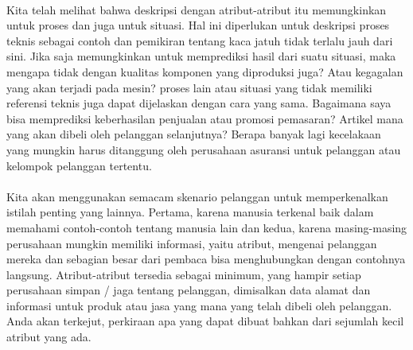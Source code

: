\paragraph{} Kita telah melihat bahwa deskripsi dengan atribut-atribut itu memungkinkan untuk proses dan juga untuk situasi. Hal ini diperlukan untuk deskripsi proses teknis sebagai contoh dan pemikiran tentang kaca jatuh tidak terlalu jauh dari sini. Jika saja memungkinkan untuk memprediksi hasil dari suatu situasi, maka mengapa tidak dengan kualitas komponen yang diproduksi juga? Atau kegagalan yang akan terjadi pada mesin? proses lain atau situasi yang tidak memiliki referensi teknis juga dapat dijelaskan dengan cara yang sama. Bagaimana saya bisa memprediksi keberhasilan penjualan atau promosi pemasaran? Artikel mana yang akan dibeli oleh pelanggan selanjutnya? Berapa banyak lagi kecelakaan yang mungkin harus ditanggung oleh perusahaan asuransi untuk pelanggan atau kelompok pelanggan tertentu.

\paragraph{} Kita akan menggunakan semacam skenario pelanggan untuk memperkenalkan istilah penting yang lainnya. Pertama, karena manusia terkenal baik dalam memahami contoh-contoh tentang manusia lain dan kedua, karena masing-masing perusahaan mungkin memiliki informasi, yaitu atribut, mengenai pelanggan mereka dan sebagian besar dari pembaca bisa menghubungkan dengan contohnya langsung. Atribut-atribut tersedia sebagai minimum, yang hampir setiap perusahaan simpan / jaga tentang pelanggan, dimisalkan data alamat dan informasi untuk produk atau jasa yang mana yang telah dibeli oleh pelanggan. Anda akan terkejut, perkiraan apa yang dapat dibuat bahkan dari sejumlah kecil atribut yang ada.

